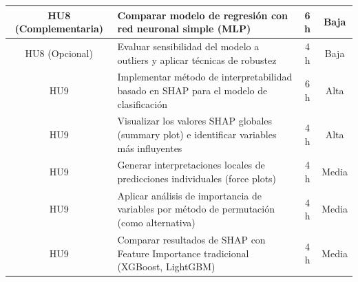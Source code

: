 \documentclass[
11pt, %
]{charter}
\begin{document}
\begin{table}[htpb]
\begin{tabularx}{\linewidth}{@{}|c|X|c|c|@{}}
HU8 (Complementaria) & Comparar modelo de regresión con red neuronal simple (MLP) & 6 h & Baja \\ \hline
HU8 (Opcional) & Evaluar sensibilidad del modelo a outliers y aplicar técnicas de robustez & 4 h & Baja \\ \hline

HU9 & Implementar método de interpretabilidad basado en SHAP para el modelo de clasificación & 6 h & Alta \\ \hline
HU9 & Visualizar los valores SHAP globales (summary plot) e identificar variables más influyentes & 4 h & Alta \\ \hline
HU9 & Generar interpretaciones locales de predicciones individuales (force plots) & 4 h & Media \\ \hline
HU9 & Aplicar análisis de importancia de variables por método de permutación (como alternativa) & 4 h & Media \\ \hline
HU9 & Comparar resultados de SHAP con Feature Importance tradicional (XGBoost, LightGBM) & 4 h & Media \\ \hline

\end{tabularx}
\end{table}
\end{document}
